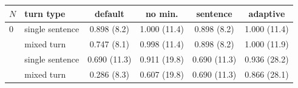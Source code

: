 \begin{tabular}{llcccc}
\toprule
$N$ & turn type & default & no min. & sentence & adaptive \\
\midrule
0 & single sentence & 0.898 (8.2) & 1.000 (11.4) & 0.898 (8.2) & 1.000 (11.4) \\
 & mixed turn & 0.747 (8.1) & 0.998 (11.4) & 0.898 (8.2) & 1.000 (11.9) \\
\addlinespace[2pt]
350 & single sentence & 0.690 (11.3) & 0.911 (19.8) & 0.690 (11.3) & 0.936 (28.2) \\
 & mixed turn & 0.286 (8.3) & 0.607 (19.8) & 0.690 (11.3) & 0.866 (28.1) \\
\bottomrule
\end{tabular}
